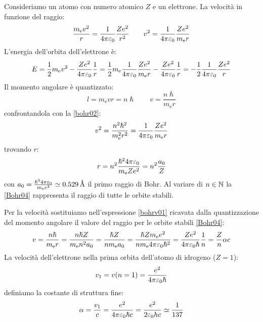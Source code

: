Consideriamo un atomo con numero atomico $Z$ e un elettrone. La velocità in funzione del raggio:
\begin{equation}
	\frac{m_{\mathrm{e}}v^2}{r}=\frac{1}{4\pi\varepsilon_0}\frac{Ze^2}{r^2}\qquad v^2=\frac{1}{4\pi\varepsilon_0}\frac{Ze^2}{m_{\mathrm{e}}r}
	\label{bohr02}
\end{equation}
L'energia dell'orbita dell'elettrone è:
\begin{equation}
	E=\frac{1}{2}m_{\mathrm{e}}v^2-\frac{Ze^2}{4\pi\varepsilon_0}\frac{1}{r}=\frac{1}{2}m_{\mathrm{e}}\frac{1}{4\pi\varepsilon_0}\frac{Ze^2}{m_{\mathrm{e}}r}-\frac{Ze^2}{4\pi\varepsilon_0}\frac{1}{r}=-\frac{1}{2}\frac{1}{4\pi\varepsilon_0}\frac{Ze^2}{r}
	\label{BohrEn}
\end{equation}
Il momento angolare è quantizzato:
\begin{equation}
	l=m_{\mathrm{e}}vr=n\hslash\qquad v=\frac{n\hslash}{m_{\mathrm{e}}r}
	\label{bohrv01}
\end{equation}
confrontandola con la \eqref{bohr02}:
\begin{equation}
	v^2=\frac{n^2\hslash^2}{m_{\mathrm{e}}^2r^2}=\frac{1}{4\pi\varepsilon_0}\frac{Ze^2}{m_{\mathrm{e}}r}
\end{equation}
trovando $r$:
\begin{equation}
	r=n^2\frac{\hslash^24\pi\varepsilon_0}{m_{\mathrm{e}}Ze^2}=n^2\frac{a_0}{Z}
	\label{Bohr04}
\end{equation}
con $a_0=\frac{\hslash^24\pi\varepsilon_0}{m_\mathrm{e}e^2}\simeq \SI{0.529}{\angstrom}$ il primo raggio di Bohr. Al variare di $n\in\mathbb{N}$ la \eqref{Bohr04} rappresenta il raggio di tutte le orbite stabili.

Per la velocità sostituiamo nell'espressione \eqref{bohrv01} ricavata dalla quantizzazione del momento angolare il valore del raggio per le orbite stabili \eqref{Bohr04}:
\begin{equation}
	v=\frac{n\hslash}{m_{\mathrm{e}}r}=\frac{n\hslash Z}{m_{\mathrm{e}}n^2a_0}=\frac{\hslash Z}{nm_\mathrm{e}a_0}=\frac{\hslash Z m_\mathrm{e} e^2}{n m_\mathrm{e}4\pi\varepsilon_0\hslash^2}=\frac{Ze^2}{4\pi\varepsilon_0\hslash}\frac{1}{n}=\frac{Z}{n}\alpha c
\end{equation}
La velocità dell'elettrone nella prima orbita dell'atomo di idrogeno ($Z=1$):
\begin{equation}
	v_1=v(n=1)=\frac{e^2}{4\pi\varepsilon_0\hslash}
\end{equation}
definiamo la costante di struttura fine:
\begin{equation}
	\alpha=\frac{v_1}{c}=\frac{e^2}{4\pi\varepsilon_0\hslash c}=\frac{e^2}{2\varepsilon_0hc}\simeq\frac{1}{137}
\end{equation}


